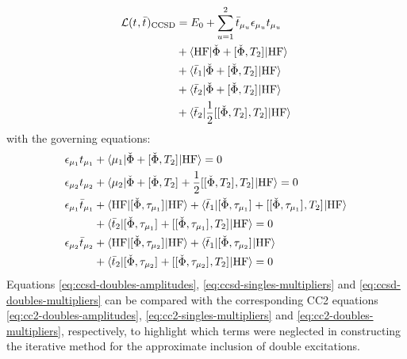 \begin{equation}\label{eq:ccsd-lagrangian}
 \begin{aligned}
 \mathcal{L}(t_{}, \bar{t}_{})_\mathrm{CCSD}
&=
 E_0
 + \sum_{u=1}^{2}\bar{t}_{\mu_u}\epsilon_{\mu_u}t_{\mu_u} \\
 &+ \braket{\mathrm{HF} | \check{\Phi} + [ \check{\Phi}, T_2 ]^{} | \mathrm{HF}} \\
 &+ \braket{\bar{t}_{1} | \check{\Phi} + [ \check{\Phi}, T_2 ]^{} | \mathrm{HF}} \\
 &+ \braket{\bar{t}_{2} | \check{\Phi} + [ \check{\Phi}, T_2 ]^{} | \mathrm{HF}} \\
 &+ \braket{\bar{t}_{2} |
   \frac{1}{2}[ [ \check{\Phi}, T_2 ]^{}, T_2 ]^{} | \mathrm{HF}}
  \end{aligned}
\end{equation}
with the governing equations:
\begin{subequations}\label{eq:ccsd-equations}
  \begin{align}
   \epsilon_{\mu_1}t_{\mu_1} &+ \braket{\mu_1 | \check{\Phi} + [ \check{\Phi}, T_2 ]^{} | \mathrm{HF}}
             = 0 \label{eq:ccsd-singles-amplitudes}\\
   \epsilon_{\mu_2}t_{\mu_2} &+
   \braket{\mu_2 | \check{\Phi} + [ \check{\Phi}, T_2 ]^{} +\frac{1}{2}[ [ \check{\Phi}, T_2 ]^{}, T_2 ]^{} | \mathrm{HF}}
             = 0 \label{eq:ccsd-doubles-amplitudes}\\
    \epsilon_{\mu_1}\bar{t}_{\mu_1} &+
    \braket{\mathrm{HF} | [ \check{\Phi}, \tau_{\mu_1} ]^{} | \mathrm{HF}} +
    \braket{\bar{t}_{1} |
      [ \check{\Phi}, \tau_{\mu_1} ]^{}
    + [ [ \check{\Phi}, \tau_{\mu_1} ]^{}, T_2 ]^{}
    | \mathrm{HF}} \nonumber \\
   &+ \braket{\bar{t}_{2} |
      [ \check{\Phi}, \tau_{\mu_1} ]^{}
    + [ [ \check{\Phi}, \tau_{\mu_1} ]^{}, T_2 ]^{}
    | \mathrm{HF}}
             = 0 \label{eq:ccsd-singles-multipliers} \\
    \epsilon_{\mu_2}\bar{t}_{\mu_2} &+
    \braket{\mathrm{HF} | [ \check{\Phi}, \tau_{\mu_2} ]^{} | \mathrm{HF}} +
    \braket{\bar{t}_{1} |
      [ \check{\Phi}, \tau_{\mu_2} ]^{}
    | \mathrm{HF}} \nonumber \\
   &+ \braket{\bar{t}_{2} |
      [ \check{\Phi}, \tau_{\mu_2} ]^{}
    + [ [ \check{\Phi}, \tau_{\mu_2} ]^{}, T_2 ]^{}
    | \mathrm{HF}}
             = 0 \label{eq:ccsd-doubles-multipliers}
  \end{align}
\end{subequations}
Equations \eqref{eq:ccsd-doubles-amplitudes},
\eqref{eq:ccsd-singles-multipliers} and \eqref{eq:ccsd-doubles-multipliers} can
be compared with the corresponding \acrshort{CC2} equations
\eqref{eq:cc2-doubles-amplitudes}, \eqref{eq:cc2-singles-multipliers} and
\eqref{eq:cc2-doubles-multipliers}, respectively, to highlight which terms were neglected in
constructing the iterative method for the approximate inclusion of double excitations.

